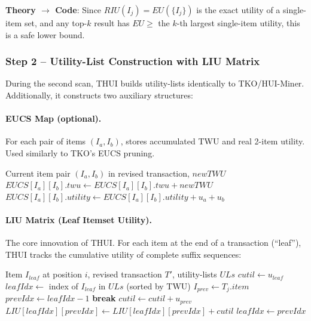 \textbf{Theory $\to$ Code}: Since $RIU(I_j) = EU(\{I_j\})$ is the exact utility of a single-item set, and any top-$k$ result has $EU \geq$ the $k$-th largest single-item utility, this is a safe lower bound.

\subsubsection{Step 2 -- Utility-List Construction with LIU Matrix}

During the second scan, THUI builds utility-lists identically to TKO/HUI-Miner. Additionally, it constructs two auxiliary structures:

\paragraph{EUCS Map (optional).} For each pair of items $(I_a, I_b)$, stores accumulated TWU and real 2-item utility. Used similarly to TKO's EUCS pruning.

\begin{algorithm}[H]
\caption{EUCS Pairwise Utility Update (Ref: \texttt{thui/thui.go}, \texttt{updateEUCSprune}, lines 439--458)}
\label{alg:eucs}
\begin{algorithmic}[1]
\Require Current item pair $(I_a, I_b)$ in revised transaction, $newTWU$
    \State $EUCS[I_a][I_b].twu \leftarrow EUCS[I_a][I_b].twu + newTWU$
    \State $EUCS[I_a][I_b].utility \leftarrow EUCS[I_a][I_b].utility + u_a + u_b$
\EndFor
\end{algorithmic}
\end{algorithm}

\paragraph{LIU Matrix (Leaf Itemset Utility).} The core innovation of THUI. For each item at the end of a transaction (``leaf''), THUI tracks the cumulative utility of complete suffix sequences:

\begin{algorithm}[H]
\caption{LIU Matrix Update --- Leaf Itemset Utility (Ref: \texttt{thui/thui.go}, \texttt{updateLeafprune}, lines 460--480)}
\label{alg:liu}
\begin{algorithmic}[1]
\Require Item $I_{leaf}$ at position $i$, revised transaction $T'$, utility-lists $ULs$
\State $cutil \leftarrow u_{leaf}$ 
\State $leafIdx \leftarrow$ index of $I_{leaf}$ in $ULs$ (sorted by TWU)
 
    \State $I_{prev} \leftarrow T_{j}.item$
    \State $prevIdx \leftarrow leafIdx - 1$
        \State \textbf{break} 
    \EndIf
    \State $cutil \leftarrow cutil + u_{prev}$
    \State $LIU[leafIdx][prevIdx] \leftarrow LIU[leafIdx][prevIdx] + cutil$
    \State $leafIdx \leftarrow prevIdx$
\EndFor
\end{algorithmic}
\end{algorithm}

